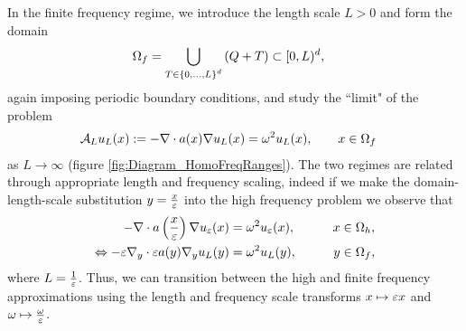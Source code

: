 In the finite frequency regime, we introduce the length scale $L>0$ and form the domain
\begin{align*}
	\Omega_f &= \bigcup_{T\in\left\{ 0,...,L \right\}^d}\left( Q + T \right)\subset[0,L)^d,
\end{align*}
again imposing periodic boundary conditions, and study the ``limit" of the problem
\begin{align*}
	\mathcal{A}_L u_L(x) &:= -\nabla\cdot a(x)\nabla u_L(x) = \omega^2 u_L(x), \qquad x\in\Omega_f
\end{align*}
as $L\rightarrow\infty$ (figure \ref{fig:Diagram_HomoFreqRanges}).
The two regimes are related through appropriate length and frequency scaling, indeed if we make the domain-length-scale substitution $y = \frac{x}{\varepsilon}$ into the high frequency problem we observe that
\begin{align*}
	-\nabla\cdot a\left( \frac{x}{\varepsilon} \right)\nabla u_{\varepsilon}(x) &= \omega^2 u_{\varepsilon}(x), &\qquad x\in\Omega_h, \\
	\Leftrightarrow -\varepsilon\nabla_{y}\cdot \varepsilon a(y)\nabla_{y}u_{L}(y) &= \omega^2 u_{L}(y), &\qquad y\in\Omega_f,
\end{align*}
where $L = \frac{1}{\varepsilon}$.
Thus, we can transition between the high and finite frequency approximations using the length and frequency scale transforms $x \mapsto \varepsilon x$ and $\omega \mapsto \frac{\omega}{\varepsilon}$.

